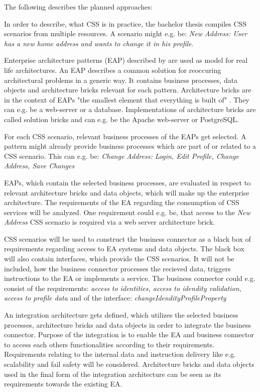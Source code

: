 \documentclass{article}
\begin{document}
The following describes the planned approaches:

In order to describe, what CSS is in practice, the bachelor thesis compiles CSS scenarios from multiple
resources. A scenario might e.g. be: \textit{New Address: User has a new home address and wants to change it in his profile}.

Enterprise architecture patterns (EAP) described by \cite{architecturePatterns} are used as model for
real life architectures. An EAP describes a common solution for reoccuring architectural problems in a 
generic way. It contains business processes, data objects and architecture bricks relevant for each pattern.
Architecture bricks are in the context of EAPs "the smallest element that everything is built of" 
\cite[Page 21]{architecturePatterns}. They can e.g. be a web-server or a database. Implementations of 
architecture bricks are called solution bricks and can e.g. be the Apache web-server or PostgreSQL.

For each CSS scenario, relevant business processes of the EAPs get selected. A pattern might already
provide business processes which are part of or related to a CSS scenario.
This can e.g. be: \textit{Change Address: Login, Edit Profile, Change Address, Save Changes}

EAPs, which contain the selected business processes, are evaluated in respect to relevant architecture 
bricks and data objects, which will make up the enterprise architecture. The requirements of the EA 
regarding the consumption of CSS services will be analyzed. One requirement could e.g. be, that access to 
the \textit{New Address} CSS scenario is required via a web server architecture brick.

CSS scenarios will be used to construct the business connector as a black box of requirements regarding 
access to EA systems and data objects. The black box will also contain interfaces, which provide the CSS 
scenarios. It will not be included, how the business 
connector processes the recieved data, triggers instructions to the EA or implements a service.
The business connector could e.g. consist of the requirements: \textit{access to identities, access to idendity validation, 
access to profile data} and of the interface: \textit{changeIdendityProfileProperty}

An integration architecture gets defined, which utilizes the selected business processes, architecture 
bricks and data objects in order to integrate the business connector. Purpose of the integration is to enable 
the EA and business connector to access each others functionalities according to their requirements.
Requirements relating to the internal data and instruction delivery like e.g. scalability and fail safety will be considered.
Architecture bricks and data objects used in the final form of the 
integration architecture can be seen as its requirements towards the existing EA.
\end{document}
